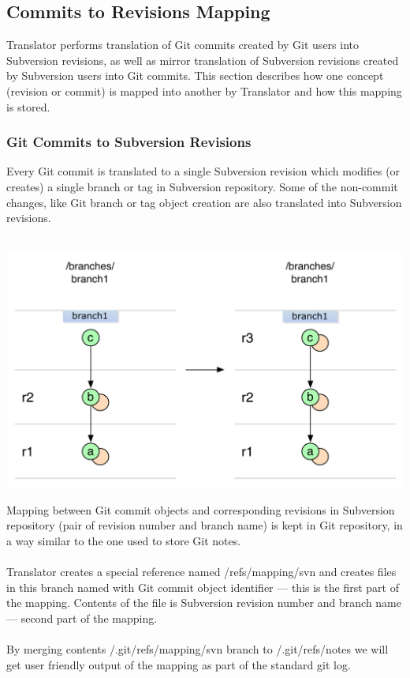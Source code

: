 \subsection{Commits to Revisions Mapping}
\renewcommand{\figurename}{Diagram}

Translator performs translation of Git commits created by Git users into Subversion revisions, as well
as mirror translation of Subversion revisions created by Subversion users into Git commits. This section
describes how one concept (revision or commit) is mapped into another by Translator and how this mapping 
is stored.

\subsubsection{Git Commits to Subversion Revisions}

Every Git commit is translated to a single Subversion revision which modifies (or creates) a single branch or tag
in Subversion repository. Some of the non-commit changes, like Git branch or tag object creation are also translated into Subversion revisions.\\\\
\begin{center}
\includegraphics[width=\textwidth]{img/diagrams/single_change_git_to_svn.pdf}%
\label{simple_git_to_svn}%
\end{center}

Mapping between Git commit objects and corresponding revisions in Subversion repository (pair of revision number and branch name) is 
kept in Git repository, in a way similar to the one used to store Git notes. 
\\\\
Translator creates a special reference named /refs/mapping/svn and creates files in this branch named with Git commit object identifier --- this is the first part of the mapping. 
Contents of the file is Subversion revision number and branch name --- second part of the mapping.
\\\\ 
By merging contents /.git/refs/mapping/svn branch to /.git/refs/notes we will get user friendly output of the mapping as part of the standard git log.

